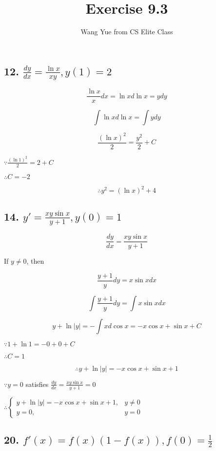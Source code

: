 \documentclass{article}
\begin{document}
  \title{Exercise 9.3}
  \author{Wang Yue from CS Elite Class}
  \maketitle

  \subsection*{12. $\frac{dy}{dx} = \frac{\ln x}{xy}, y(1) = 2$}

  $$\frac{\ln x}{x} dx = \ln x d \ln x = y dy$$

  $$\int \ln x d\ln x = \int y dy$$

  $$\frac{(\ln x)^2}{2} = \frac{y^2}{2} + C$$

  $\because \frac{(\ln 1)^2}{2} = 2 + C$

  $\therefore C = -2$

  $$\therefore y^2 = (\ln x)^2 + 4$$

  \subsection*{14. $ y' = \frac{xy \sin x}{y + 1}, y(0) = 1 $}

  $$\frac{dy}{dx} = \frac{xy \sin x}{y + 1}$$

  If $y \not = 0$, then

  $$\frac{y+1}{y}dy = x \sin x dx$$

  $$\int \frac{y+1}{y}dy = \int x \sin x dx$$

  $$y + \ln |y| = -\int x d\cos x = -x\cos x + \sin x + C$$

  $\because 1 + \ln 1 = -0 + 0 + C$

  $\therefore C = 1$

  $$\therefore y + \ln |y| = -x\cos x + \sin x + 1$$

  $\because y = 0$ satisfies $\frac{dy}{dx} = \frac{xy \sin x}{y + 1} = 0$

  $\therefore \left\{ \begin{array}{ll} y + \ln |y| = -x\cos x + \sin x + 1, & y \not = 0 \\ y = 0, &y = 0 \end{array}\right.$

  \subsection*{20. $ f'(x) = f(x)(1-f(x)), f(0) = \frac 1 2 $}
\end{document}
